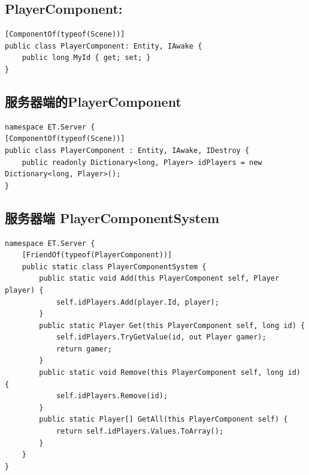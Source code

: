 \documentclass[9pt, b5paper]{article}
\begin{document}
\subsection{PlayerComponent:}
\label{sec-9-2}
\begin{verbatim}
[ComponentOf(typeof(Scene))]
public class PlayerComponent: Entity, IAwake {
    public long MyId { get; set; }
}
\end{verbatim}
\subsection{服务器端的PlayerComponent}
\label{sec-9-3}
\begin{verbatim}
namespace ET.Server {
[ComponentOf(typeof(Scene))]
public class PlayerComponent : Entity, IAwake, IDestroy {
    public readonly Dictionary<long, Player> idPlayers = new Dictionary<long, Player>();
}
\end{verbatim}
\subsection{服务器端 PlayerComponentSystem}
\label{sec-9-4}
\begin{verbatim}
namespace ET.Server {
    [FriendOf(typeof(PlayerComponent))]
    public static class PlayerComponentSystem {
        public static void Add(this PlayerComponent self, Player player) {
            self.idPlayers.Add(player.Id, player);
        }
        public static Player Get(this PlayerComponent self, long id) {
            self.idPlayers.TryGetValue(id, out Player gamer);
            return gamer;
        }
        public static void Remove(this PlayerComponent self, long id) {
            self.idPlayers.Remove(id);
        }
        public static Player[] GetAll(this PlayerComponent self) {
            return self.idPlayers.Values.ToArray();
        }
    }
}
\end{verbatim}
\end{document}
